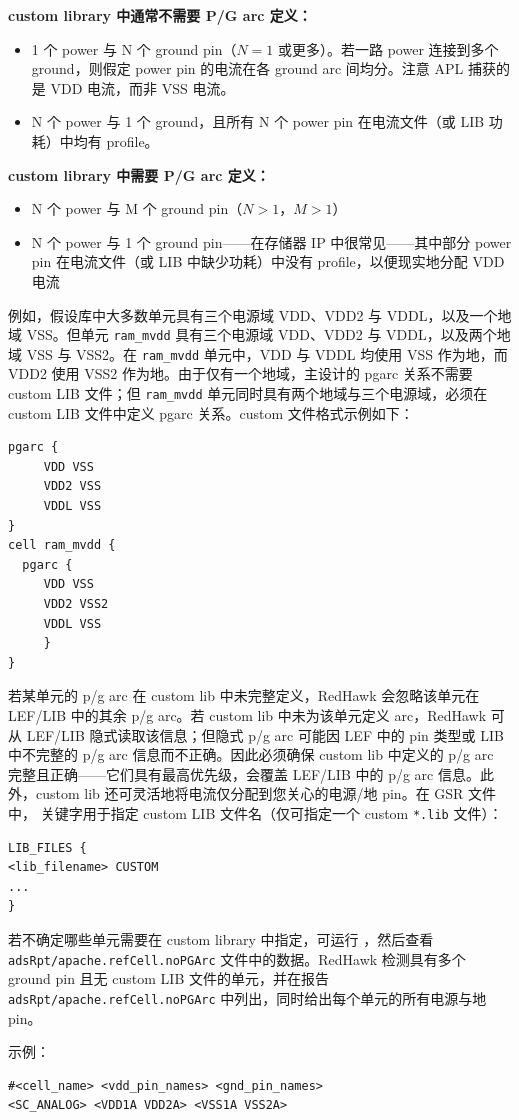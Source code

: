 \textbf{custom library 中通常不需要 P/G arc 定义：}
\begin{itemize}
  \item 1 个 power 与 N 个 ground pin（$N = 1$ 或更多）。若一路 power 连接到多个 ground，则假定 power pin 的电流在各 ground arc 间均分。注意 APL 捕获的是 VDD 电流，而非 VSS 电流。
  \item N 个 power 与 1 个 ground，且所有 N 个 power pin 在电流文件（或 LIB 功耗）中均有 profile。
\end{itemize}

\textbf{custom library 中需要 P/G arc 定义：}
\begin{itemize}
  \item N 个 power 与 M 个 ground pin（$N > 1$，$M > 1$）
  \item N 个 power 与 1 个 ground pin——在存储器 IP 中很常见——其中部分 power pin 在电流文件（或 LIB 中缺少功耗）中没有 profile，以便现实地分配 VDD 电流
\end{itemize}

例如，假设库中大多数单元具有三个电源域 VDD、VDD2 与 VDDL，以及一个地域 VSS。但单元 \texttt{ram\_mvdd} 具有三个电源域 VDD、VDD2 与 VDDL，以及两个地域 VSS 与 VSS2。在 \texttt{ram\_mvdd} 单元中，VDD 与 VDDL 均使用 VSS 作为地，而 VDD2 使用 VSS2 作为地。由于仅有一个地域，主设计的 pgarc 关系不需要 custom LIB 文件；但 \texttt{ram\_mvdd} 单元同时具有两个地域与三个电源域，必须在 custom LIB 文件中定义 pgarc 关系。custom 文件格式示例如下：
\begin{lstlisting}
pgarc {
     VDD VSS
     VDD2 VSS
     VDDL VSS
}
cell ram_mvdd {
  pgarc {
     VDD VSS
     VDD2 VSS2
     VDDL VSS
     }
}
\end{lstlisting}

\begin{noteBox}
若某单元的 p/g arc 在 custom lib 中未完整定义，RedHawk 会忽略该单元在 LEF/LIB 中的其余 p/g arc。若 custom lib 中未为该单元定义 arc，RedHawk 可从 LEF/LIB 隐式读取该信息；但隐式 p/g arc 可能因 LEF 中的 pin 类型或 LIB 中不完整的 p/g arc 信息而不正确。因此必须确保 custom lib 中定义的 p/g arc 完整且正确——它们具有最高优先级，会覆盖 LEF/LIB 中的 p/g arc 信息。此外，custom lib 还可灵活地将电流仅分配到您关心的电源/地 pin。在 GSR 文件中， 关键字用于指定 custom LIB 文件名（仅可指定一个 custom \texttt{*.lib} 文件）：
\begin{lstlisting}
LIB_FILES {
<lib_filename> CUSTOM
...
}
\end{lstlisting}
若不确定哪些单元需要在 custom library 中指定，可运行 ，然后查看 \texttt{adsRpt/apache.refCell.noPGArc} 文件中的数据。RedHawk 检测具有多个 ground pin 且无 custom LIB 文件的单元，并在报告 \texttt{adsRpt/apache.refCell.noPGArc} 中列出，同时给出每个单元的所有电源与地 pin。

示例：
\begin{lstlisting}
#<cell_name> <vdd_pin_names> <gnd_pin_names>
<SC_ANALOG> <VDD1A VDD2A> <VSS1A VSS2A>
\end{lstlisting}
\end{noteBox}

